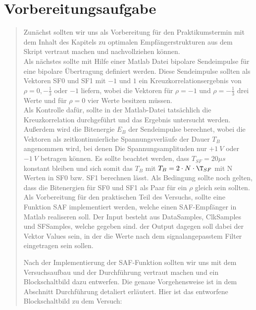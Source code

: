 \section{Vorbereitungsaufgabe}
\begin{quote}
    
    Zunächst sollten wir uns als Vorbereitung für den Praktikumstermin mit dem
    Inhalt des Kapitels zu optimalen Empfängerstrukturen aus dem Skript vertraut
    machen und nachvollziehen können.\\
    
    Als nächstes sollte mit Hilfe einer Matlab Datei bipolare Sendeimpulse
    für eine bipolare Übertragung definiert werden. Diese Sendeimpulse sollten als
    Vektoren SF0 und SF1 mit $-1$ und $1$ ein Kreuzkorrelationsergebnis von $\rho
    = 0, -\frac{1}{3}$ oder $-1$ liefern, wobei die Vektoren für $\rho = -1$ und
    $\rho = -\frac{1}{3}$ drei Werte und für $\rho = 0$ vier Werte besitzen
    müssen.\\
    Als Kontrolle dafür, sollte in der Matlab-Datei tatsächlich die
    Kreuzkorrelation durchgeführt und das Ergebnis untersucht werden. Außerdem wird
    die Bitenergie $E_B$ der Sendeimpulse berechnet, wobei die Vektoren als
    zeitkontinuierliche Spannungsverläufe der Dauer $T_B$ angenommen wird, bei
    denen Die Spannungsamplituden nur $+1\ V$ oder $-1\ V$ betragen können.
    Es sollte beachtet werden, dass $T_{SF} = 20\mu s$ konstant bleiben und sich
    somit das $T_B$ mit $T_B = 2 \cdot N \cdot \T_{SF}$ mit N Werten in SF0 bzw.
    SF1 berechnen lässt. Als Bedingung sollte noch gelten, dass die Bitenergien für
    SF0 und SF1 als Paar für ein $\rho$ gleich sein sollten.\\
    
    Als Vorbereitung für den praktischen Teil des Versuchs, sollte eine Funktion
    SAF implementiert werden, welche einen SAF-Empfänger in Matlab realiseren soll.
    Der Input besteht aus DataSamples, ClkSamples und SFSamples, welche gegeben
    sind. der Output dagegen soll dabei der Vektor Values sein, in der die Werte
    nach dem signalangepasstem Filter eingetragen sein sollen.\\
    
    
    Nach der Implementierung der SAF-Funktion sollten wir uns mit dem
    Versuchsaufbau und der Durchführung vertraut machen und  ein Blockschaltbild
    dazu entwerfen. Die genaue Vorgehensweise ist in dem Abschnitt Durchführung
    detaliert erläutert. Hier ist das entworfene Blockschaltbild zu dem Versuch:\\
    

\end{quote}
